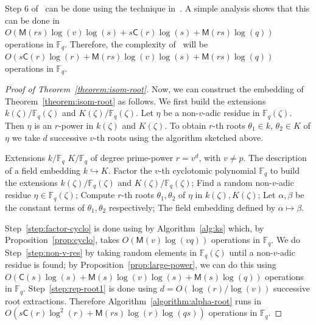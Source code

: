 \documentclass[12pt]{article}
\theoremstyle{plain}
\theoremstyle{definition}
\def\F{\ensuremath{\mathbb{F}}}
\def\MM{\ensuremath{\mathsf{M}}}
\def\CC{\ensuremath{\mathsf{C}}}
\newcounter{algorithm}
\begin{document}
Step 6 of~\cite[Algorithm~3]{doliskanischost2011} can be done using the technique
in~\cite[Lemma~14]{shoup94}. A simple analysis shows that this can be done in $O(\MM(rs)\log(v)\log(s) + 
s\CC(r)\log(s) + \MM(rs)\log(q))$ operations in $\F_q$. Therefore, the complexity
of~\cite[Algorithm~3]{doliskanischost2011} will be $O(s\CC(r)\log(r) + \MM(rs)\log(v)\log(s) + 
\MM(rs)\log(q))$ operations in $\F_q$.

\begin{proof}[Proof of Theorem~\ref{theorem:isom-root}]
Now, we can construct the embedding of Theorem~\ref{theorem:isom-root} as follows. We first build the 
extensions $k(\zeta) / \F_q(\zeta)$ and $K(\zeta)/\F_q(\zeta)$. Let $\eta$ be a non-$v$-adic residue in $\F_q(\zeta)$. 
Then $\eta$ is an $r$-power in $k(\zeta)$ and $K(\zeta)$. To obtain $r$-th roots $\theta_1\in k$, $\theta_2\in K$ of $\eta$ we take $d$ 
successive $v$-th roots using the algorithm sketched above. 

\begin{algorithm}
	\label{algorithm:alpha-root}
	\begin{algorithmic}[1]
		\REQUIRE Extensions $k / \F_q$ $K/\F_q$ of degree prime-power $r = v^d$, with $v\ne p$.
		\ENSURE The description of a field embedding $k\hookrightarrow K$.
		\STATE\label{step:factor-cyclo} Factor the $v$-th cyclotomic polynomial $\F_q$ to 
		build the extensions $k(\zeta) / \F_q(\zeta)$ and $K(\zeta)/\F_q(\zeta)$;
		\STATE\label{step:non-v-res} Find a random non-$v$-adic residue $\eta \in \F_q(\zeta)$;
		\STATE\label{step:rep-root1} Compute $r$-th roots $\theta_1,\theta_2$ of $\eta$ in $k(\zeta),K(\zeta)$;
		\STATE Let $\alpha, \beta$ be the constant terms of $\theta_1, \theta_2$ respectively;
		\RETURN The field embedding defined by $\alpha\mapsto\beta$.
	\end{algorithmic}
\end{algorithm}

Step~\ref{step:factor-cyclo} is done using by Algorithm~\ref{alg:ks} which, by Proposition~\ref{prop:cyclo}, takes $O(\MM(v)\log(vq))$ operations in $\F_q$. We do Step~\ref{step:non-v-res} by taking random elements in $\F_q(\zeta)$ until a non-$v$-adic residue is found; by Proposition~\ref{prop:large-power},
we can do this using $O(\CC(s)\log(s) + \MM(s)\log(v)\log(s) + \MM(s)\log(q))$ operations in 
$\F_q$. Step~\ref{step:rep-root1} is done using $d = O(\log(r) / \log(v))$ successive root 
extractions. Therefore Algorithm~\ref{algorithm:alpha-root} runs in $O(s\CC(r)\log^2(r) + 
\MM(rs)\log(r)\log(qs))$ operations in $\F_q$.
\end{proof}
\end{document}
